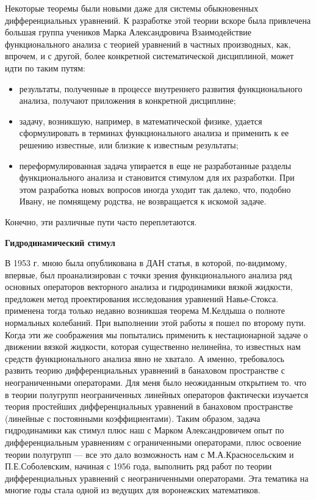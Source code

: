 Некоторые теоремы были новыми даже для системы
\linebreak
обы\-к\-но\-вен\-ных дифференциальных уравнений.
К разработке этой теории вскоре была привлечена большая группа учеников Марка Александровича Взаимодействие функционального анализа с теорией уравнений в частных производных, как, впрочем, и с другой, более конкретной систематической дисциплиной, может идти по таким путям:
\begin{itemize}
	\item
		результаты,   полученные   в процессе внутреннего развития функционального анализа, получают приложения в конкретной дисциплине;
	\item
		задачу, возникшую, например, в математической физике, удается
	 сформулировать в терминах функционального анализа и применить к ее решению известные, или близкие к известным результаты;
	\item
		переформулированная задача упирается в еще не разработанные разделы функционального анализа и становится стимулом для их разработки. При этом разработка новых вопросов иногда уходит так далеко, что, подобно Ивану, не помнящему родства, не возвращается к искомой задаче.
\end{itemize}
Конечно, эти различные пути часто переплетаются.

{\bf Гидродинамический стимул}

В 1953 г. мною была опубликована в ДАН статья, в которой, по-видимому, впервые, был проанализирован с точки зрения функционального анализа ряд основных операторов векторного анализа и гидродинамики вязкой жидкости, предложен метод проектирования исследования уравнений Навье-Стокса. применена тогда только недавно возникшая теорема М.Келдыша о полноте нормальных колебаний. При выполнении этой работы я пошел по второму пути. Когда эти же соображения мы попытались применить к нестационарной задаче о движении вязкой жидкости, которая существенно нелинейна, то известных нам средств функционального анализа явно не хватало. А именно, требовалось развить теорию дифференциальных уравнений в банаховом пространстве с неограниченными операторами. Для меня было неожиданным открытием то. что в теории полугрупп неограниченных линейных операторов фактически изучается теория простейших дифференциальных уравнений в банаховом пространстве (линейные с постоянными коэффициентами). Таким образом, задача гидродинамики как стимул плюс наш с Марком Александровичем опыт по дифференциальным уравнениям с ограниченными операторами, плюс освоение теории полугрупп — все это дало возможность нам с М.А.Красносельским и П.Е.Соболевским, начиная с 1956 года, выполнить ряд работ по теории дифференциальных уравнений с неограниченными операторами. Эта тематика на многие годы стала одной из ведущих для воронежских математиков.

